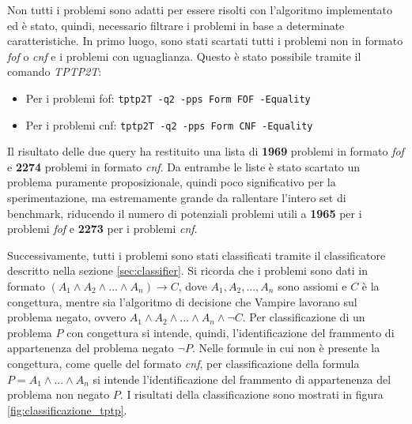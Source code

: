\documentclass[./main.tex]{subfiles}
\begin{document}
Non tutti i problemi sono adatti per essere risolti con l'algoritmo implementato ed è 
stato, quindi, necessario filtrare i problemi in base a determinate caratteristiche.
In primo luogo, sono stati scartati tutti i problemi non in formato \textit{fof} o \textit{cnf} e
i problemi con uguaglianza. Questo è stato possibile tramite il comando \textit{TPTP2T}:

\begin{itemize}
    \item Per i problemi fof: \texttt{tptp2T -q2 -pps Form FOF -Equality}
    \item Per i problemi cnf: \texttt{tptp2T -q2 -pps Form CNF -Equality}
\end{itemize}

Il risultato delle due query ha restituito una lista di \textbf{1969} problemi in formato \textit{fof} e
\textbf{2274} problemi in formato \textit{cnf}. 
Da entrambe le liste è stato scartato un problema puramente proposizionale,
quindi poco significativo per la sperimentazione, ma estremamente grande da rallentare l'intero set di benchmark,
riducendo il numero di potenziali problemi utili a \textbf{1965} per i problemi \textit{fof} e \textbf{2273} per i problemi \textit{cnf}.

Successivamente, tutti i problemi sono stati classificati tramite il classificatore descritto nella sezione \ref{sec:classifier}.
Si ricorda che i problemi sono dati in formato $(A_1 \land A_2 \land ... \land A_n) \rightarrow C$, dove 
$A_1, A_2, ..., A_n$ sono assiomi e $C$ è la congettura, mentre 
sia l'algoritmo di decisione che Vampire lavorano sul problema negato, ovvero $A_1 \land A_2 \land ... \land A_n \land \lnot C$.
Per classificazione di un problema $P$ con congettura si intende, quindi, l'identificazione del frammento di appartenenza del problema negato $\lnot P$.
Nelle formule in cui non è presente la congettura, come quelle del formato \textit{cnf}, 
per classificazione della formula $P = A_1 \land ... \land A_n$ si intende l'identificazione del frammento di appartenenza del
problema non negato $P$.
I risultati della classificazione sono mostrati in figura \ref{fig:classificazione_tptp}.
\end{document}
